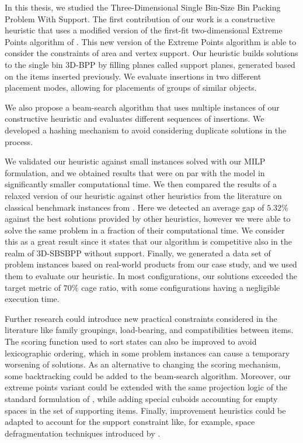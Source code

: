 In this thesis, we studied the Three-Dimensional Single Bin-Size Bin Packing Problem With Support.
The first contribution of our work is a constructive heuristic that uses a modified version of the first-fit two-dimensional Extreme Points algorithm of \citet{crainic2008extreme}. This new version of the Extreme Points algorithm is able to consider the constraints of area and vertex support.
Our heuristic builds solutions to the single bin 3D-BPP by filling planes called support planes, generated based on the items inserted previously.
We evaluate insertions in two different placement modes, allowing for placements of groups of similar objects.

We also propose a beam-search algorithm that uses multiple instances of our constructive heuristic and evaluates different sequences of insertions. We developed a hashing mechanism to avoid considering duplicate solutions in the process.

We validated our heuristic against small instances solved with our MILP formulation, and we obtained results that were on par with the model in significantly smaller computational time.
We then compared the results of a relaxed version of our heuristic against other heuristics from the literature on classical benchmark instances from \citet{martello2000three}. Here we detected an average gap of $5.32\%$ against the best solutions provided by other heuristics, however we were able to solve the same problem in a fraction of their computational time. We consider this as a great result since it states that our algorithm is competitive also in the realm of 3D-SBSBPP without support.
Finally, we generated a data set of problem instances based on real-world products from our case study, and we used them to evaluate our heuristic. In most configurations, our solutions exceeded the target metric of $70\%$ cage ratio, with some configurations having a negligible execution time.

Further research could introduce new practical constraints considered in the literature like family groupings, load-bearing, and compatibilities between items.
The scoring function used to sort states can also be improved to avoid lexicographic ordering, which in some problem instances can cause a temporary worsening of solutions.
As an alternative to changing the scoring mechanism, some backtracking could be added to the beam-search algorithm.
Moreover, our extreme points variant could be extended with the same projection logic of the standard formulation of \citet{crainic2008extreme}, while adding special cuboids accounting for empty spaces in the set of supporting items.
Finally, improvement heuristics could be adapted to account for the support constraint like, for example, space defragmentation techniques introduced by \cite{ZHU2012452}.